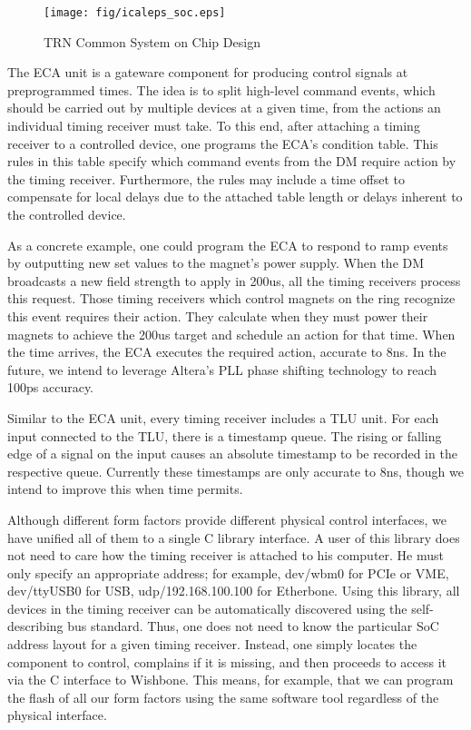 \begin{figure}[htb]
   \centering
   \texttt{[image: fig/icaleps\_soc.eps]}
   \caption{TRN Common System on Chip Design}
   \label{soc}
\end{figure}


The ECA unit is a gateware component for producing control
signals at preprogrammed times.
The idea is to split high-level command events,
which should be carried out by multiple devices at a given time,
from the actions an individual timing receiver must take.
To this end, 
after attaching a timing receiver to a controlled device,
one programs the ECA's condition table.
This rules in this table 
specify which command events from the DM
require action by the timing receiver.
Furthermore, the rules may include a time offset to compensate 
for local delays due to the attached table length or delays
inherent to the controlled device.

As a concrete example, 
one could program the ECA to respond to ramp events
by outputting new set values to the magnet's power supply.
When the DM broadcasts a new field strength to apply in 200us,
all the timing receivers process this request.
Those timing receivers which control magnets on the ring
recognize this event requires their action.
They calculate when they must power their magnets to achieve
the 200us target and schedule an action for that time.
When the time arrives, the ECA executes the required action,
accurate to 8ns.
In the future,
we intend to leverage Altera's PLL phase shifting technology 
to reach 100ps accuracy.

Similar to the ECA unit,
every timing receiver includes a TLU unit.
For each input connected to the TLU, 
there is a timestamp queue.
The rising or falling edge of a signal on the input
causes an absolute timestamp to be recorded in the 
respective queue.
Currently these timestamps are only accurate to 8ns,
though we intend to improve this when time permits.

Although different form factors provide different physical control interfaces, 
we have unified all of them to a single C library interface.
A user of this library does not need to care how the timing 
receiver is attached to his computer.
He must only specify an appropriate address;
for example,
dev/wbm0 for PCIe or VME,
dev/ttyUSB0 for USB,
udp/192.168.100.100 for Etherbone.
Using this library, all devices in the timing receiver
can be automatically discovered using the self-describing bus standard.
Thus, one does not need to know the particular SoC address layout
for a given timing receiver.
Instead, one simply locates the component to control,
complains if it is missing,
and then proceeds to access it via the C interface to Wishbone.
This means, for example, 
that we can program the flash of all our form factors using the same 
software tool regardless of the physical interface.

